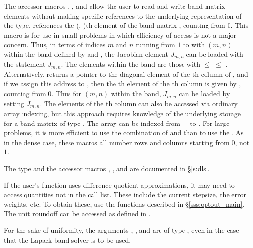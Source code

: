 {{  The accessor macros , , and  
  allow the user to read and write band matrix elements without making specific 
  references to the underlying representation of the  type.
   references the (, )th element of the 
  band matrix , counting from $0$.
  This macro is for use in small problems in which efficiency of access is not
  a major concern.  Thus, in terms of indices $m$ and $n$ running from $1$ to
   with $(m,n)$ within the band defined by  and
  , the Jacobian element $J_{m,n}$ can be loaded with the 
  statement  $J_{m,n}$. The elements within
  the band are those with  $\le$  $\le$ .
  Alternatively,  returns a pointer to the diagonal element
  of the th column of , and if we assign this address to 
  , then the th element of the th column is
  given by , counting from $0$.
  Thus for $(m,n)$ within the band, $J_{m,n}$ can be loaded by setting 
    $J_{m,n}$.
  The elements of the th column can also be accessed
  via ordinary array indexing, but this approach requires knowledge of
  the underlying storage for a band matrix of type .  
  The array  can be indexed from $-$ to .
  For large problems, it is more efficient to use the combination of
   and  than to use the
  .  As in the dense case, these macros all number rows
  and columns starting from $0$, not $1$.  

  The  type and the accessor macros , , and
   are documented in \S\ref{s:dls}.

  If the user's  function uses difference quotient approximations,
  it may need to access quantities not in the call list. These include the current
  stepsize, the error weights, etc. To obtain these, use the  functions 
  described in \S\ref{sss:optout_main}. The unit roundoff can be accessed
  as  defined in .

  For the sake of uniformity, the arguments , , and  are
  of type , even in the case that the Lapack band solver is to be used.
}
}
